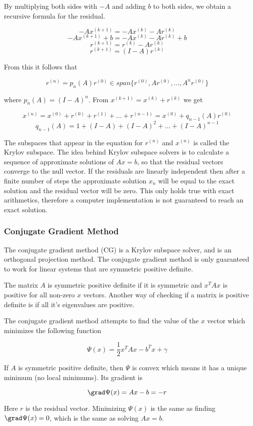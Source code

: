 By multiplying both sides with $-A$ and adding $b$ to both sides, we obtain a 
recursive formula for the residual.

$$ -Ax^{(k+1)} = -Ax^{(k)} - Ar^{(k)} $$
$$ -Ax^{(k+1)} + b = -Ax^{(k)} - Ar^{(k)} + b $$
$$ r^{(k+1)} = r^{(k)} - Ar^{(k)} $$
$$ r^{(k+1)} = (I - A)r^{(k)} $$

From this it follows that 

$$ r^{(n)} = p_n(A)r^{(0)} \in span \{r^{(0)}, Ar^{(0)}, ..., A^{n}r^{(0)}\} $$

where $p_n(A) = (I - A)^n$. From $ x^{(k+1)} = x^{(k)} + r^{(k)} $ we get 

$$ x^{(n)} = x^{(0)} + r^{(0)} + r^{(1)} + ... + r^{(n-1)} = x^{(0)} + q_{n-1}(A)r^{(0)} $$
$$ q_{n-1}(A) = 1 + (I-A) + (I-A)^2 + ... + (I-A)^{n-1} $$

The subspaces that appear in the equation for $r^{(n)}$ and $x^{(n)}$ is called the 
Krylov subspace. The idea behind Krylov subspace solvers is to calculate a sequence 
of approximate solutions of $Ax = b$, so that the residual vectors converge to the 
null vector. If the residuals are linearly independent then 
after a finite number of steps the approximate solution $x_n$ will be equal to the 
exact solution and the residual vector will be zero. This only holds true with exact 
arithmetics, therefore a computer implementation is not guaranteed to reach an exact 
solution\cite{krylovSolvers}.

\subsubsection{Conjugate Gradient Method}

The conjugate gradient method (CG) is a Krylov subspace solver, and is an orthogonal 
projection method. The conjugate gradient method is only guaranteed to work for 
linear systems that are symmetric positive definite.

The matrix $A$ is symmetric positive definite if it is symmetric and $x^T A x$ is 
positive for all non-zero $x$ vectors. Another way of checking if a matrix is 
positive definite is if all it's eigenvalues are positive. 

The conjugate gradient method attempts to find the value of the $x$ vector which 
minimizes the following function

$$ \Psi(x) = \frac{1}{2}x^T A x - b^T x + \gamma $$

If $A$ is symmetric positive definite, then $\Psi$ is convex which means it has 
a unique minimum (no local minimums). Its gradient is 

$$ \grad \Psi(x) = Ax-b = -r $$

Here $r$ is the residual vector. Minimizing $\Psi(x)$ is the same as finding 
$\grad \Psi(x) = 0$, which is the same as solving $Ax = b$.
